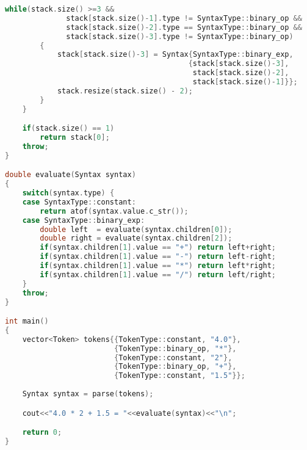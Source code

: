 \documentclass{scrartcl}
\begin{document}
{\begin{lstlisting}[language=C++]
        while(stack.size() >=3 &&
              stack[stack.size()-1].type != SyntaxType::binary_op &&
              stack[stack.size()-2].type == SyntaxType::binary_op &&
              stack[stack.size()-3].type != SyntaxType::binary_op)
        {
            stack[stack.size()-3] = Syntax{SyntaxType::binary_exp,
                                          {stack[stack.size()-3],
                                           stack[stack.size()-2],
                                           stack[stack.size()-1]}};
            stack.resize(stack.size() - 2);
        }
    }

    if(stack.size() == 1)
        return stack[0];
    throw;
}

double evaluate(Syntax syntax)
{
    switch(syntax.type) {
    case SyntaxType::constant:
        return atof(syntax.value.c_str());
    case SyntaxType::binary_exp:
        double left  = evaluate(syntax.children[0]);
        double right = evaluate(syntax.children[2]);
        if(syntax.children[1].value == "+") return left+right;
        if(syntax.children[1].value == "-") return left-right;
        if(syntax.children[1].value == "*") return left*right;
        if(syntax.children[1].value == "/") return left/right;
    }
	throw;
}

int main()
{
    vector<Token> tokens{{TokenType::constant, "4.0"},
                         {TokenType::binary_op, "*"},
                         {TokenType::constant, "2"},
                         {TokenType::binary_op, "+"},
                         {TokenType::constant, "1.5"}};
  
    Syntax syntax = parse(tokens);

    cout<<"4.0 * 2 + 1.5 = "<<evaluate(syntax)<<"\n";

    return 0;
}

\end{lstlisting}}
\end{document}
